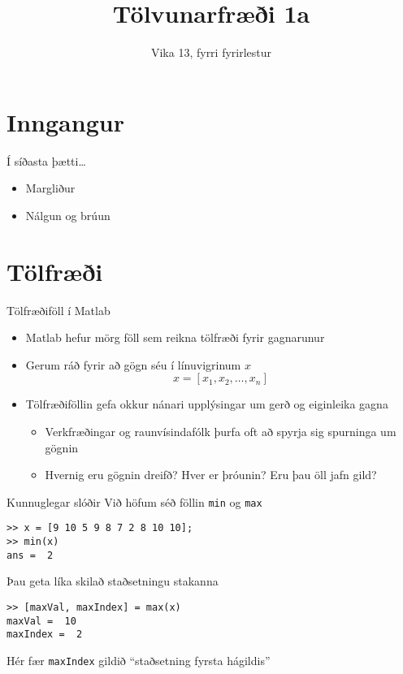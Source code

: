 \documentclass[handout]{beamer}
\title{Tölvunarfræði 1a}
\subtitle{Vika 13, fyrri fyrirlestur}
\begin{document}
\begin{frame}
\titlepage
\end{frame}

\section{Inngangur}

\begin{frame}{Í síðasta þætti\ldots}
    \begin{itemize}
        \item Margliður
        \item Nálgun og brúun
    \end{itemize}
\end{frame}

\section{Tölfræði}

\begin{frame}{Tölfræðiföll í Matlab}
\begin{itemize}
 \item Matlab hefur mörg föll sem reikna tölfræði fyrir gagnarunur
 \item Gerum ráð fyrir að gögn séu í línuvigrinum $x$
\[
 x = [x_1,x_2, \ldots, x_n]
\]
 \item Tölfræðiföllin gefa okkur nánari upplýsingar um gerð og eiginleika gagna
 \begin{itemize}
  \item Verkfræðingar og raunvísindafólk þurfa oft að spyrja sig spurninga um gögnin
  \item Hvernig eru gögnin dreifð? Hver er þróunin? Eru þau öll jafn gild?
 \end{itemize}
\end{itemize}

\end{frame}

\begin{frame}[fragile]{Kunnuglegar slóðir}
Við höfum séð föllin \texttt{min} og \texttt{max}
\begin{verbatim}
>> x = [9 10 5 9 8 7 2 8 10 10];
>> min(x)
ans =  2
\end{verbatim}
Þau geta líka skilað staðsetningu stakanna
\begin{verbatim}
>> [maxVal, maxIndex] = max(x)
maxVal =  10
maxIndex =  2
\end{verbatim}
Hér fær \texttt{maxIndex} gildið ``staðsetning fyrsta hágildis''
\end{frame}
\end{document}
